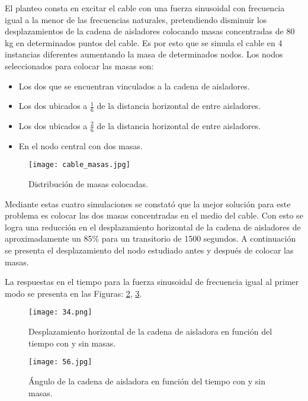 El planteo consta en excitar el cable con una fuerza sinusoidal con frecuencia igual a la menor de las frecuencias naturales, pretendiendo disminuir los desplazamientos de la cadena de aisladores colocando masas concentradas de 80 kg en determinados puntos del cable. Es por esto que se simula el cable en 4 instancias diferentes aumentando la masa de determinados nodos. Los nodos seleccionados para colocar las masas son:
\begin{itemize}
	\item Los dos que se encuentran vinculados a la cadena de aisladores.
	\item Los dos ubicados a $\frac{1}{6}$ de la distancia horizontal de entre aisladores.
	\item Los dos ubicados a $\frac{2}{6}$ de la distancia horizontal de entre aisladores.
	\item En el nodo central con dos masas.
\end{itemize}





\begin{figure}[h]
	\centering
	\texttt{[image: cable\_masas.jpg]}
	\caption{Distribución de masas colocadas.}
	\label{masas}
\end{figure}




\newpage
Mediante estas cuatro simulaciones se constató que la mejor solución para este problema es colocar las dos masas concentradas en el medio del cable. Con esto se logra una reducción en el desplazamiento horizontal de la cadena de aisladores de aproximadamente un 85\% para un transitorio de 1500 segundos. A continuación se presenta el desplazamiento del nodo estudiado antes y después de colocar las masas.


La respuestas en el tiempo para la fuerza sinusoidal de frecuencia igual al primer modo se presenta en las Figuras: \ref{desphorizsinm}, \ref{angulosinm}.

\begin{figure}[h]
	\centering
	\texttt{[image: 34.png]}
	\caption{Desplazamiento horizontal de la cadena de aisladora en función del tiempo con y sin masas.}
	\label{desphorizsinm}
\end{figure}

\begin{figure}[h]
	\centering
	\texttt{[image: 56.jpg]}
	\caption{Ángulo de la cadena de aisladora en función del tiempo con y sin masas.}
	\label{angulosinm}
\end{figure}






